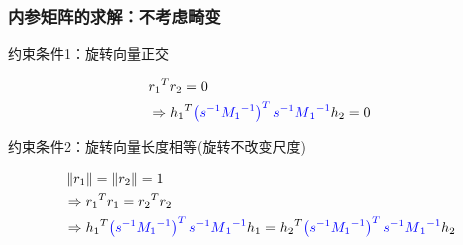 \documentclass[aspectratio=43]{beamer}
\begin{document}
	\begin{frame}
		\frametitle{内参矩阵的求解：不考虑畸变}
		\begin{block}{约束条件1：旋转向量正交}
			\begin{small}
				\begin{align}
					& {r_1}^Tr_2=0 \nonumber
					\\
					& \Rightarrow {h_1}^T{\color{blue} \left( s ^{-1} {M_1}^{-1} \right) ^Ts ^{-1} {M{\color{blue} _1}}^{-1}}h_2=0 \label{内参矩阵的求解约束条件1}
				\end{align}
			\end{small}
		\end{block}
		
		\begin{block}{约束条件2：旋转向量长度相等(旋转不改变尺度)}
			\begin{small}
				\begin{align}
					& \left\| r_1 \right\| =\left\| r_2 \right\| =1 \nonumber
					\\
					& \Rightarrow {r_1}^Tr_1={r_2}^Tr_2 \nonumber
					\\
					& \Rightarrow {h_1}^T{\color{blue} \left( s ^{-1}{M_1}^{-1} \right) ^Ts ^{-1}{M{\color{blue} _1}}^{-1}}h_1={h_2}^T{\color{blue} \left( s ^{-1}{M_1}^{-1} \right) ^Ts ^{-1}{M{\color{blue} _1}}^{-1}}h_2 \label{内参矩阵的求解约束条件2}
				\end{align}
			\end{small}
		\end{block}
	\end{frame}	
	
\end{document}
